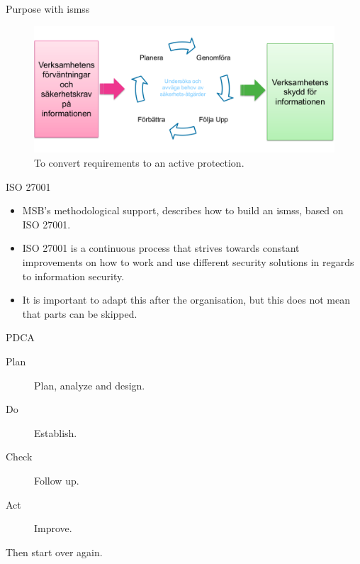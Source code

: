 \documentclass{beamer}
\begin{document}
\begin{frame}{Purpose with \acp{isms}}
  \begin{figure}
    \includegraphics[width=\textwidth]{infosak-pdca.png}
    \caption{To convert requirements to an active protection.}
  \end{figure}
\end{frame}

\begin{frame}{ISO 27001}
  \begin{itemize}
    \item MSB's methodological support, describes how to build an \acp{isms},
      based on ISO 27001.

    \item ISO 27001 is a continuous process that strives towards constant
      improvements on how to work and use different security solutions in
      regards to information security.

    \item It is important to adapt this after the organisation, but this does
      not mean that parts can be skipped.

  \end{itemize}
\end{frame}

\begin{frame}{PDCA}
  \begin{description}
    \item[Plan] Plan, analyze and design.
    \item[Do] Establish.
    \item[Check] Follow up.
    \item[Act] Improve.
  \end{description}
  Then start over again.
\end{frame}
\end{document}
